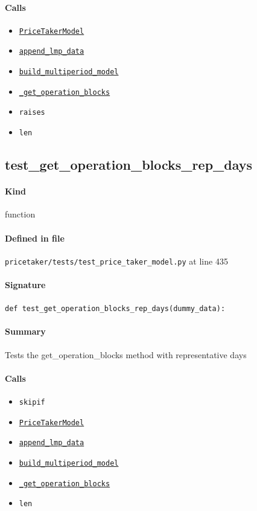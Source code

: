 \documentclass[11pt]{report}
\begin{document}
\paragraph{Calls}
\begin{itemize}[leftmargin=*]
  \item \hyperref[def:pricetaker-price_taker_model.py:PriceTakerModel:L161]{\texttt{PriceTakerModel}}
  \item \hyperref[def:pricetaker-price_taker_model.py:PriceTakerModel.append_lmp_data:L221]{\texttt{append\_lmp\_data}}
  \item \hyperref[def:pricetaker-price_taker_model.py:PriceTakerModel.build_multiperiod_model:L291]{\texttt{build\_multiperiod\_model}}
  \item \hyperref[def:pricetaker-price_taker_model.py:PriceTakerModel._get_operation_blocks:L445]{\texttt{\_get\_operation\_blocks}}
  \item \texttt{raises}
  \item \texttt{len}
\end{itemize}
\subsection{test\_get\_operation\_blocks\_rep\_days}
\label{def:pricetaker-tests-test_price_taker_model.py:test_get_operation_blocks_rep_days:L435}
\paragraph{Kind} function
\paragraph{Defined in file} \texttt{pricetaker/tests/test\_price\_taker\_model.py} at line 435
\paragraph{Signature} \texttt{def test\_get\_operation\_blocks\_rep\_days(dummy\_data):}
\paragraph{Summary} Tests the get\_operation\_blocks method with representative days
\paragraph{Calls}
\begin{itemize}[leftmargin=*]
  \item \texttt{skipif}
  \item \hyperref[def:pricetaker-price_taker_model.py:PriceTakerModel:L161]{\texttt{PriceTakerModel}}
  \item \hyperref[def:pricetaker-price_taker_model.py:PriceTakerModel.append_lmp_data:L221]{\texttt{append\_lmp\_data}}
  \item \hyperref[def:pricetaker-price_taker_model.py:PriceTakerModel.build_multiperiod_model:L291]{\texttt{build\_multiperiod\_model}}
  \item \hyperref[def:pricetaker-price_taker_model.py:PriceTakerModel._get_operation_blocks:L445]{\texttt{\_get\_operation\_blocks}}
  \item \texttt{len}
\end{itemize}
\end{document}
